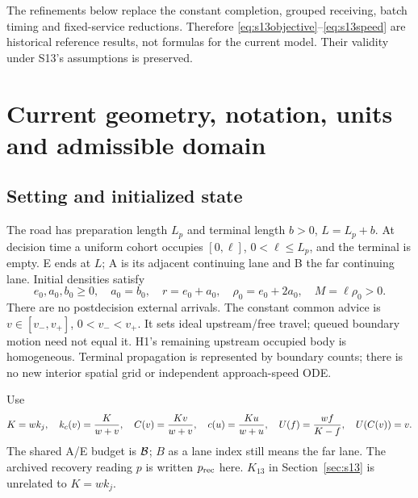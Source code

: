 The refinements below replace the constant completion, grouped receiving,
batch timing and fixed-service reductions. Therefore
\eqref{eq:s13objective}--\eqref{eq:s13speed} are historical reference
results, not formulas for the current model. Their validity under S13's
assumptions is preserved.

\section{Current geometry, notation, units and admissible domain}
\label{sec:domain}
\subsection{Setting and initialized state}
The road has preparation length $L_p$ and terminal length $b>0$,
$L=L_p+b$. At decision time a uniform cohort occupies $[0,\ell]$,
$0<\ell\leq L_p$, and the terminal is empty. E ends at $L$; A is its
adjacent continuing lane and B the far continuing lane. Initial densities
satisfy
\begin{equation}
 e_0,a_0,b_0\geq0,\quad a_0=b_0,\quad
 r=e_0+a_0,\quad\rho_0=e_0+2a_0,\quad M=\ell\rho_0>0.
 \label{eq:initial}
\end{equation}
There are no postdecision external arrivals. The constant common advice
is $v\in[v_-,v_+]$, $0<v_-<v_+$. It sets ideal upstream/free travel;
queued boundary motion need not equal it. H1's remaining upstream occupied
body is homogeneous. Terminal propagation is represented by boundary counts;
there is no new interior spatial grid or independent approach-speed ODE.

Use
\begin{equation}
 K=wk_j,\quad k_c(v)=\frac K{w+v},\quad
 C(v)=\frac{Kv}{w+v},\quad c(u)=\frac{Ku}{w+u},\quad
 U(f)=\frac{wf}{K-f},\quad U(C(v))=v.
 \label{eq:fd}
\end{equation}
The shared A/E budget is $\mathcal B$; $B$ as a lane index still means the
far lane. The archived recovery reading $p$ is written $p_{\mathrm{rec}}$ here.
$K_{13}$ in Section~\ref{sec:s13} is unrelated to $K=wk_j$.

